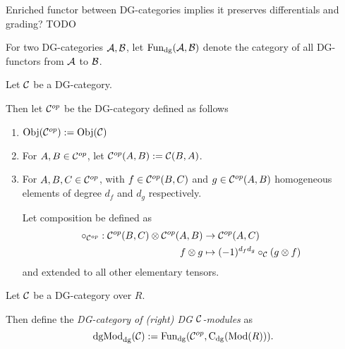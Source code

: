 \begin{remark}
    Enriched functor between DG-categories implies it preserves differentials and grading? TODO
\end{remark}

\begin{notation}
    For two DG-categories \( {\mathcal{A}}, {\mathcal{B}} \), let \( \operatorname{Fun}_{\operatorname{dg}}({\mathcal{A}}, {\mathcal{B}}) \) denote the category of all DG-functors from \( {\mathcal{A}} \) to \( {\mathcal{B}} \).
\end{notation}

\begin{definition}
    Let \( {\mathcal{C}} \) be a DG-category.

    Then let \( {\mathcal{C}}^{op} \) be the DG-category defined as follows
    \begin{enumerate}
        \item {
            \( \operatorname{Obj}({\mathcal{C}}^{op}) := \operatorname{Obj}({\mathcal{C}}) \)
        }
        \item {
            For \( A, B \in {\mathcal{C}}^{op} \), let \( {\mathcal{C}}^{op}(A, B) := {\mathcal{C}}(B, A) \).
        }
        \item {
            For \( A, B, C \in {\mathcal{C}}^{op} \), with \( f \in {\mathcal{C}}^{op}(B, C) \) and \( g \in {\mathcal{C}}^{op}(A, B) \) homogeneous elements of degree \( d_f \) and \( d_g \) respectively.

            Let composition be defined as
            \begin{align*}
                \circ_{{\mathcal{C}}^{op}}: {\mathcal{C}}^{op}(B, C) \otimes {\mathcal{C}}^{op}(A, B) &\to {\mathcal{C}}^{op}(A, C) \\
                f \otimes g &\mapsto (-1)^{d_f d_g} \circ_{{\mathcal{C}}} (g \otimes f)
            \end{align*}
            and extended to all other elementary tensors.
        }
    \end{enumerate}
\end{definition}

\begin{definition}[\( \dgMod_{\dg}(\Cc) \)]
    Let \( {\mathcal{C}} \) be a DG-category over \( R \).

    Then define the \emph{DG-category of (right) DG \( {\mathcal{C}} \)-modules} as
    \[
        \operatorname{dgMod}_{\operatorname{dg}}({\mathcal{C}}) := \operatorname{Fun}_{\operatorname{dg}}({\mathcal{C}}^{op}, \operatorname{C}_{\operatorname{dg}}(\operatorname{Mod}(R))).
    \]
\end{definition}

